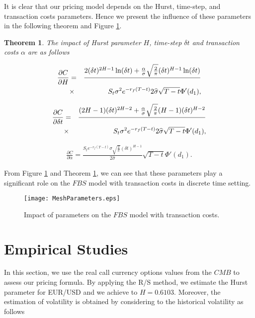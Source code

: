 \documentclass[a4paper,11pt]{amsart}
\numberwithin{equation}{section}
\theoremstyle{definition}
\theoremstyle{plain}
\newtheorem{thm}{Theorem}[section]
\theoremstyle{definition}
\newcommand{\1}{\mathbf{1}}
\begin{document}
It is clear that our pricing model depends on the Hurst, time-step, and transaction costs parameters. Hence we present the influence of these parameters in the following theorem and Figure \ref{fig:1}.

\begin{thm} The impact of Hurst parameter $H$, time-step $\delta t$ and transaction costs $\alpha $ are as follows

\begin{eqnarray}
\frac{\partial C}{\partial H}&=&\frac{2( \delta t)^{2H-1}\ln (\delta t)+\frac{\alpha}{\sigma}\sqrt{\frac{2}{\pi}}( \delta t)^{H-1}\ln (\delta t)}\nonumber\\
&\times&S_t\sigma^2e^{-r_f(T-t)}{2\widehat{\sigma}}\sqrt{T-t}\Phi'(d_1),
\label{eq:19}
\end{eqnarray}

\begin{eqnarray}
\frac{\partial C}{\partial \delta t}&=&\frac{(2H-1)(\delta t)^{2H-2}+\frac{\alpha}{\sigma}\sqrt{\frac{2}{\pi}}(H-1)(\delta t)^{H-2}}\nonumber\\
&\times&S_t\sigma^2e^{-r_f(T-t)}{2\widehat{\sigma}}\sqrt{T-t}\Phi'(d_1),
\label{eq:20}
\end{eqnarray}

\begin{eqnarray}
\frac{\partial C}{\partial \alpha}=\frac{S_te^{-r_f(T-t)}\sigma\sqrt{\frac{2}{\pi}}(\delta t)^{H-1}}{2\widehat{\sigma}}\sqrt{T-t}\Phi'(d_1).
\label{eq:21}
\end{eqnarray}
\label{p:4}
\end{thm}


From Figure \ref{fig:1} and Theorem \ref{p:4}, we can see that these parameters play a significant role on the $FBS$ model with transaction costs in discrete time setting.
\begin{figure}[H]
  \centering
          \texttt{[image: MeshParameters.eps]}

  \caption{Impact of parameters on the $FBS$ model with transaction costs.}
\label{fig:1}
\end{figure}





\section{Empirical Studies}\label{sec:4}

In this section, we use the real call currency options values from the $CMB$ to assess our pricing formula. By applying the R/S method, we estimate the Hurst parameter for EUR/USD  and we achieve to $H=0.6103$. Moreover, the
estimation of volatility is obtained by considering to the historical volatility as
follows
\end{document}

